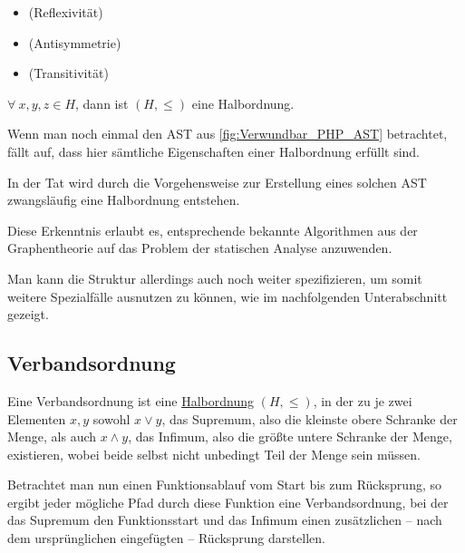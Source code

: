             \begin{itemize}
                \item {} (Reflexivität)
                \item {} (Antisymmetrie)
                \item {} (Transitivität)
            \end{itemize}

            \( \forall\ x, y, z \in H \),
            dann ist
            \( (H, \leq) \) eine Halbordnung.\cite{Ringel2005}

            Wenn man noch einmal den
            \gls{AST} aus
            \vref{fig:Verwundbar_PHP_AST} betrachtet,
            fällt auf,
            dass hier sämtliche Eigenschaften einer Halbordnung erfüllt sind.

            In der Tat wird durch die Vorgehensweise zur Erstellung eines solchen
            \gls{AST} zwangsläufig eine Halbordnung entstehen.

            Diese Erkenntnis erlaubt es,
            entsprechende bekannte Algorithmen aus der Graphentheorie auf das Problem der statischen Analyse anzuwenden.

            Man kann die Struktur allerdings auch noch weiter spezifizieren,
            um somit weitere Spezialfälle ausnutzen zu können,
            wie im nachfolgenden Unterabschnitt gezeigt.

        \subsection{Verbandsordnung}\label{Verbandsordnung}
            Eine Verbandsordnung ist eine
            \hyperref[Halbordnung]{Halbordnung}
            \( (H, \leq) \),
            in der zu je zwei Elementen
            \( x, y \) sowohl
            \( x \lor y \),
            das Supremum,
            also die kleinste obere Schranke der Menge,
            als auch
            \( x \land y \),
            das Infimum,
            also die größte untere Schranke der Menge,
            existieren,
            wobei beide selbst nicht unbedingt Teil der Menge sein müssen.\cite{Prisner2000}

            Betrachtet man nun einen Funktionsablauf vom Start bis zum Rücksprung,
            so ergibt jeder mögliche Pfad durch diese Funktion eine Verbandsordnung,
            bei der das Supremum den Funktionsstart und
            das Infimum einen zusätzlichen
            -- nach dem ursprünglichen eingefügten
            -- Rücksprung darstellen.

